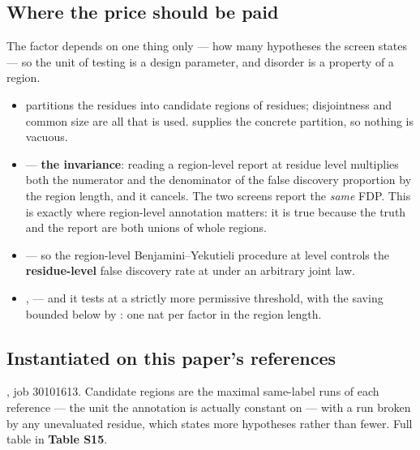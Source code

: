 \subsection*{Where the price should be paid}

The factor depends on one thing only --- how many hypotheses the screen states ---
so the unit of testing is a design parameter, and disorder is a property of a
region.

\begin{itemize}\itemsep1pt \parskip0pt
\item {} partitions the  residues into  candidate regions of 
  residues; disjointness and common size are all that is used. 
  supplies the concrete partition, so nothing is vacuous.
\item {} --- \textbf{the invariance}: reading a region-level report at residue
  level multiplies both the numerator and the denominator of the false
  discovery proportion by the region length, and it cancels. The two screens
  report the \emph{same} FDP. This is exactly where region-level annotation matters:
  it is true because the truth and the report are both unions of whole regions.
\item {} --- so the region-level Benjamini--Yekutieli procedure at
  level  controls the \textbf{residue-level} false discovery rate at  under
  an arbitrary joint law.
\item {},  --- and it tests at a
  strictly more permissive threshold, with the saving bounded below by
  : one nat per factor in the region length.
\end{itemize}


\subsection*{Instantiated on this paper's references}

, job 30101613. Candidate regions are the
maximal same-label runs of each reference --- the unit the annotation is actually
constant on --- with a run broken by any unevaluated residue, which states more
hypotheses rather than fewer. Full table in \textbf{Table S15}.

